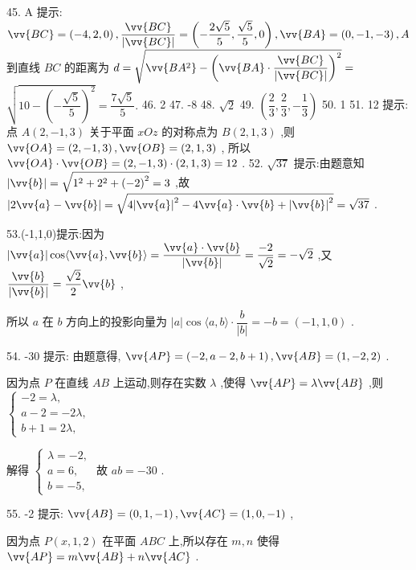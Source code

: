 45. A 提示: $\vv{BC} = \left( {-4,2,0}\right) ,\dfrac{\vv{BC}}{\left| \vv{BC}\right| } = \left( {-\dfrac{2\sqrt{5}}{5},\dfrac{\sqrt{5}}{5},0}\right) ,\vv{BA} = \left( {0, - 1, - 3}\right) ,A$ 到直线 ${BC}$ 的距离为 $d = \sqrt{\vv{B{A}^{2}} - {\left( \vv{BA} \cdot  \dfrac{\vv{BC}}{\left| \vv{BC}\right| }\right) }^{2}} =$  $\sqrt{{10} - {\left( -\dfrac{\sqrt{5}}{5}\right) }^{2}} = \dfrac{7\sqrt{5}}{5}.$ 46. 2 47. -8 48. $\sqrt{2}$ 49. $\left( {\dfrac{2}{3},\dfrac{2}{3}, - \dfrac{1}{3}}\right)$ 50. 1 51. 12 提示: 点 $A\left( {2, - 1,3}\right)$ 关于平面 ${xOz}$ 的对称点为 $B\left( {2,1,3}\right)$ ,则 $\vv{OA} = \left( {2, - 1,3}\right) ,\vv{OB} = \left( {2,1,3}\right)$ , 所以 $\vv{OA} \cdot  \vv{OB} = \left( {2, - 1,3}\right)  \cdot  \left( {2,1,3}\right)  = {12}$ . 52. $\sqrt{37}$ 提示:由题意知 $\left| \vv{b}\right|  = \sqrt{{1}^{2} + {2}^{2} + {\left( -2\right) }^{2}} = 3$ ,故 $\left| {2\vv{a} - \vv{b}}\right|  = \sqrt{4{\left| \vv{a}\right| }^{2} - 4\vv{a} \cdot  \vv{b} + {\left| \vv{b}\right| }^{2}} = \sqrt{37}$ .

53.(-1,1,0)提示:因为 $\left| \vv{a}\right| \cos \langle \vv{a},\vv{b}\rangle  = \dfrac{\vv{a} \cdot  \vv{b}}{\left| \vv{b}\right| } = \dfrac{-2}{\sqrt{2}} =  - \sqrt{2}$ ,又 $\dfrac{\vv{b}}{\left| \vv{b}\right| } = \dfrac{\sqrt{2}}{2}\vv{b}$ ,

所以 $a$ 在 $b$ 方向上的投影向量为 $\left| a\right| \cos \langle a,b\rangle  \cdot  \dfrac{b}{\left| b\right| } =  - b = \left( {-1,1,0}\right)$ .

54. -30 提示: 由题意得, $\vv{AP} = \left( {-2,a - 2,b + 1}\right) ,\vv{AB} = \left( {1, - 2,2}\right)$ .

因为点 $P$ 在直线 ${AB}$ 上运动,则存在实数 $\lambda$ ,使得 $\vv{AP} = \lambda \vv{AB}$ ,则 $\left\{  \begin{array}{l}  - 2 = \lambda , \\  a - 2 =  - {2\lambda }, \\  b + 1 = {2\lambda }, \end{array}\right.$

解得 $\left\{  \begin{array}{l} \lambda  =  - 2, \\  a = 6, \\  b =  - 5, \end{array}\right.$ 故 ${ab} =  - {30}$ .

55. -2 提示: $\vv{AB} = \left( {0,1, - 1}\right) ,\vv{AC} = \left( {1,0, - 1}\right)$ ,

因为点 $P\left( {x,1,2}\right)$ 在平面 ${ABC}$ 上,所以存在 $m,n$ 使得 $\vv{AP} = m\vv{AB} + n\vv{AC}$ .

